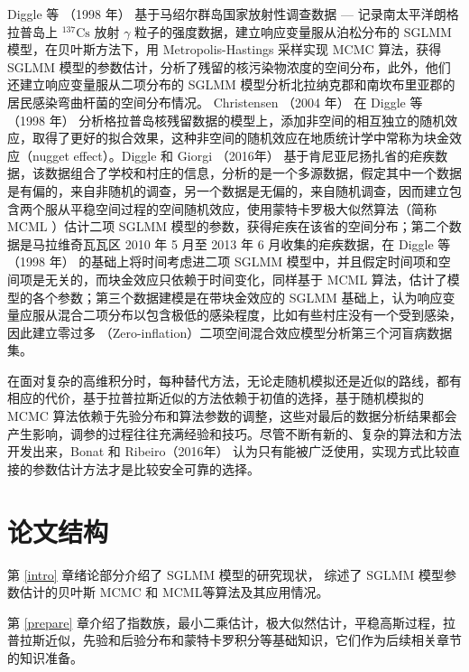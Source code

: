 \documentclass[12pt,a4paper,UTF8,twoside]{book}
\theoremstyle{definition}
\theoremstyle{definition}
\theoremstyle{definition}
\theoremstyle{remark}
\begin{document}
Diggle 等 （1998 年） \citep{Diggle1998}基于马绍尔群岛国家放射性调查数据
--- 记录南太平洋朗格拉普岛上 \({}^{137}\mathrm{Cs}\) 放射 \(\gamma\)
粒子的强度数据，建立响应变量服从泊松分布的 SGLMM
模型，在贝叶斯方法下，用 Metropolis-Hastings 采样实现 MCMC 算法，获得
SGLMM
模型的参数估计，分析了残留的核污染物浓度的空间分布，此外，他们还建立响应变量服从二项分布的
SGLMM 模型分析北拉纳克郡和南坎布里亚郡的居民感染弯曲杆菌的空间分布情况。
Christensen （2004 年） \citep{Christensen2004} 在 Diggle 等 （1998 年）
\citep{Diggle1998}
分析格拉普岛核残留数据的模型上，添加非空间的相互独立的随机效应，取得了更好的拟合效果，这种非空间的随机效应在地质统计学中常称为块金效应（nugget
effect）。Diggle 和 Giorgi （2016年） \citep{Diggle2016}
基于肯尼亚尼扬扎省的疟疾数据，该数据组合了学校和村庄的信息，分析的是一个多源数据，假定其中一个数据是有偏的，来自非随机的调查，另一个数据是无偏的，来自随机调查，因而建立包含两个服从平稳空间过程的空间随机效应，使用蒙特卡罗极大似然算法（简称
MCML ）估计二项 SGLMM
模型的参数，获得疟疾在该省的空间分布；第二个数据是马拉维奇瓦瓦区 2010 年
5 月至 2013 年 6 月收集的疟疾数据，在 Diggle 等 （1998 年）
\citep{Diggle1998}的基础上将时间考虑进二项 SGLMM
模型中，并且假定时间项和空间项是无关的，而块金效应只依赖于时间变化，同样基于
MCML 算法，估计了模型的各个参数；第三个数据建模是在带块金效应的 SGLMM
基础上，认为响应变量应服从混合二项分布以包含极低的感染程度，比如有些村庄没有一个受到感染，因此建立零过多
（Zero-inflation）二项空间混合效应模型分析第三个河盲病数据集。

在面对复杂的高维积分时，每种替代方法，无论走随机模拟还是近似的路线，都有相应的代价，基于拉普拉斯近似的方法依赖于初值的选择，基于随机模拟的
MCMC
算法依赖于先验分布和算法参数的调整，这些对最后的数据分析结果都会产生影响，调参的过程往往充满经验和技巧。尽管不断有新的、复杂的算法和方法开发出来，Bonat
和 Ribeiro（2016年） \citep{Bonat2016Practical}
认为只有能被广泛使用，实现方式比较直接的参数估计方法才是比较安全可靠的选择。

\hypertarget{stracture}{%
\section{论文结构}\label{stracture}}

第 \ref{intro} 章绪论部分介绍了 SGLMM 模型的研究现状， 综述了 SGLMM
模型参数估计的贝叶斯 MCMC 和 MCML等算法及其应用情况。

第 \ref{prepare}
章介绍了指数族，最小二乘估计，极大似然估计，平稳高斯过程，拉普拉斯近似，先验和后验分布和蒙特卡罗积分等基础知识，它们作为后续相关章节的知识准备。
\end{document}
